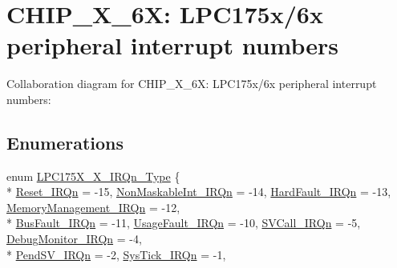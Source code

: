 \hypertarget{group__CMSIS__175X__6X__IRQ}{}\section{C\+H\+I\+P\+\_\+X\+\_\+6X\+: L\+P\+C175x/6x peripheral interrupt numbers}
\label{group__CMSIS__175X__6X__IRQ}
Collaboration diagram for C\+H\+I\+P\+\_\+X\+\_\+6X\+: L\+P\+C175x/6x peripheral interrupt numbers\+:
\subsection*{Enumerations}
\begin{DoxyCompactItemize}
\item 
enum \hyperlink{group__CMSIS__175X__6X__IRQ_gaaaeafe7bd8401a46d55e8431b6326116}{L\+P\+C175\+X\+\_\+X\+\_\+\+I\+R\+Qn\+\_\+\+Type} \{ \\*
\hyperlink{group__CMSIS__175X__6X__IRQ_ggaaaeafe7bd8401a46d55e8431b6326116a50ad21f2fd0d54d04b390d5a9145889a}{Reset\+\_\+\+I\+R\+Qn} = -\/15, 
\hyperlink{group__CMSIS__175X__6X__IRQ_ggaaaeafe7bd8401a46d55e8431b6326116ade177d9c70c89e084093024b932a4e30}{Non\+Maskable\+Int\+\_\+\+I\+R\+Qn} = -\/14, 
\hyperlink{group__CMSIS__175X__6X__IRQ_ggaaaeafe7bd8401a46d55e8431b6326116ab1a222a34a32f0ef5ac65e714efc1f85}{Hard\+Fault\+\_\+\+I\+R\+Qn} = -\/13, 
\hyperlink{group__CMSIS__175X__6X__IRQ_ggaaaeafe7bd8401a46d55e8431b6326116a33ff1cf7098de65d61b6354fee6cd5aa}{Memory\+Management\+\_\+\+I\+R\+Qn} = -\/12, 
\\*
\hyperlink{group__CMSIS__175X__6X__IRQ_ggaaaeafe7bd8401a46d55e8431b6326116a8693500eff174f16119e96234fee73af}{Bus\+Fault\+\_\+\+I\+R\+Qn} = -\/11, 
\hyperlink{group__CMSIS__175X__6X__IRQ_ggaaaeafe7bd8401a46d55e8431b6326116a6895237c9443601ac832efa635dd8bbf}{Usage\+Fault\+\_\+\+I\+R\+Qn} = -\/10, 
\hyperlink{group__CMSIS__175X__6X__IRQ_ggaaaeafe7bd8401a46d55e8431b6326116a4ce820b3cc6cf3a796b41aadc0cf1237}{S\+V\+Call\+\_\+\+I\+R\+Qn} = -\/5, 
\hyperlink{group__CMSIS__175X__6X__IRQ_ggaaaeafe7bd8401a46d55e8431b6326116a8e033fcef7aed98a31c60a7de206722c}{Debug\+Monitor\+\_\+\+I\+R\+Qn} = -\/4, 
\\*
\hyperlink{group__CMSIS__175X__6X__IRQ_ggaaaeafe7bd8401a46d55e8431b6326116a03c3cc89984928816d81793fc7bce4a2}{Pend\+S\+V\+\_\+\+I\+R\+Qn} = -\/2, 
\hyperlink{group__CMSIS__175X__6X__IRQ_ggaaaeafe7bd8401a46d55e8431b6326116a6dbff8f8543325f3474cbae2446776e7}{Sys\+Tick\+\_\+\+I\+R\+Qn} = -\/1, 

\end{DoxyCompactItemize}

